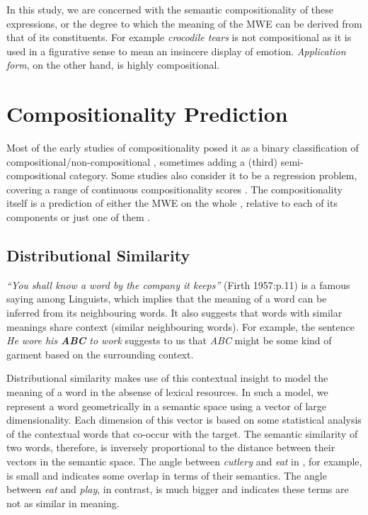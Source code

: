 In this study, we are concerned with the semantic compositionality of these expressions, or the degree to which the meaning of the MWE can be derived from that of its constituents. For example \textit{crocodile tears} is not compositional as it is used in a figurative sense to mean an insincere display of emotion. \textit{Application form}, on the other hand, is highly compositional.

\section{Compositionality Prediction}
\label{sec:Comp}
Most of the early studies of compositionality posed it as a binary classification of compositional/non-compositional \citep{Bannard2003,Bannard2006,Farah2015}, sometimes adding a (third) semi-compositional category. Some studies also consider it to be a regression problem, covering a range of continuous compositionality scores \citep{Baldwin2010,Reddy2011,Salehi2015,Hakimi2018}. The compositionality itself is a prediction of either the MWE on the whole \citep{Mccarthy2003,venkat2005,Disco2011,Kat2015,Farah2015}, relative to each of its components \citep{Reddy2011,Hermann2012} or just one of them \citep{Korkon2009}.
\subsection{Distributional Similarity}
\textit{``You shall know a word by the company it keeps''} (Firth 1957:p.11) is a famous saying among Linguists, which implies that the meaning of a word can be inferred from its neighbouring words. It also suggests that words with similar meanings share context (similar neighbouring words). For example, the sentence \textit{He wore his \textbf{ABC} to work} suggests to us that \textit{ABC} might be some kind of garment based on the surrounding context.

Distributional similarity makes use of this contextual insight to model the meaning of a word in the absense of lexical resources. In such a model, we represent a word geometrically in a semantic space using a vector of large dimensionality. Each dimension of this vector is based on some statistical analysis of the contextual words that co-occur with the target. The semantic similarity of two words, therefore, is inversely proportional to the distance between their vectors in the semantic space. The angle between \textit{cutlery} and \textit{eat} in , for example, is small and indicates some overlap in terms of their semantics. The angle between \textit{eat} and \textit{play}, in contrast, is much bigger and indicates these terms are not as similar in meaning.

